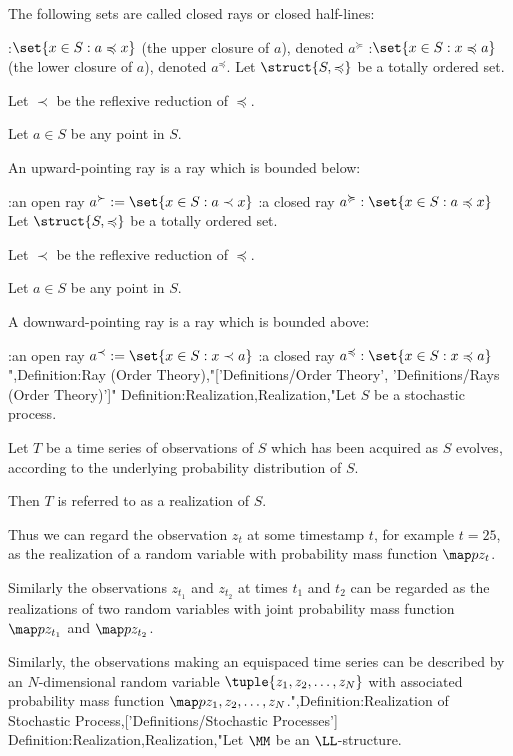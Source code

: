 The following sets are called closed rays or closed half-lines:

:$\set {x \in S: a \preccurlyeq x}$ (the upper closure of $a$), denoted $a^\succcurlyeq$
:$\set {x \in S: x \preccurlyeq a}$ (the lower closure of $a$), denoted $a^\preccurlyeq$.
Let $\struct {S, \preccurlyeq}$ be a totally ordered set.

Let $\prec$ be the reflexive reduction of $\preccurlyeq$.

Let $a \in S$ be any point in $S$.


An upward-pointing ray is a ray which is bounded below:

:an open ray $a^\succ:= \set {x \in S: a \prec x}$
:a closed ray $a^\succcurlyeq: \set {x \in S: a \preccurlyeq x}$
Let $\struct {S, \preccurlyeq}$ be a totally ordered set.

Let $\prec$ be the reflexive reduction of $\preccurlyeq$.

Let $a \in S$ be any point in $S$.


A downward-pointing ray is a ray which is bounded above:

:an open ray $a^\prec := \set {x \in S: x \prec a}$
:a closed ray $a^\preccurlyeq : \set {x \in S: x \preccurlyeq a}$
",Definition:Ray (Order Theory),"['Definitions/Order Theory', 'Definitions/Rays (Order Theory)']"
Definition:Realization,Realization,"Let $S$ be a stochastic process.

Let $T$ be a time series of observations of $S$ which has been acquired as $S$ evolves, according to the underlying probability distribution of $S$.


Then $T$ is referred to as a realization of $S$.


Thus we can regard the observation $z_t$ at some timestamp $t$, for example $t = 25$, as the realization of a random variable with probability mass function $\map p {z_t}$.

Similarly the observations $z_{t_1}$ and $z_{t_2}$ at times $t_1$ and $t_2$ can be regarded as the realizations of two random variables with joint probability mass function $\map p {z_{t_1} }$ and $\map p {z_{t_2} }$.


Similarly, the observations making an equispaced time series can be described by an $N$-dimensional random variable $\tuple {z_1, z_2, \dotsc, z_N}$ with associated probability mass function $\map p {z_1, z_2, \dotsc, z_N}$.",Definition:Realization of Stochastic Process,['Definitions/Stochastic Processes']
Definition:Realization,Realization,"Let $\MM$ be an $\LL$-structure.

